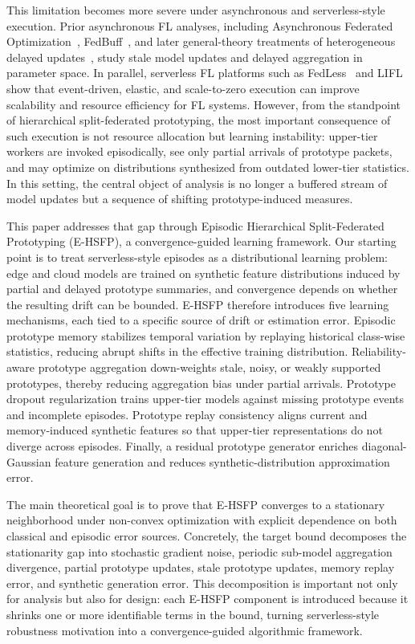 This limitation becomes more severe under asynchronous and serverless-style execution. Prior asynchronous FL analyses, including Asynchronous Federated Optimization~\cite{xie2019asynchronous}, FedBuff~\cite{nguyen2022federated}, and later general-theory treatments of heterogeneous delayed updates~\cite{fraboni2023general}, study stale model updates and delayed aggregation in parameter space. In parallel, serverless FL platforms such as FedLess~\cite{grafberger2021fedless} and LIFL~\cite{qi2024lifl} show that event-driven, elastic, and scale-to-zero execution can improve scalability and resource efficiency for FL systems. However, from the standpoint of hierarchical split-federated prototyping, the most important consequence of such execution is not resource allocation but learning instability: upper-tier workers are invoked episodically, see only partial arrivals of prototype packets, and may optimize on distributions synthesized from outdated lower-tier statistics. In this setting, the central object of analysis is no longer a buffered stream of model updates but a sequence of shifting prototype-induced measures. 

This paper addresses that gap through Episodic Hierarchical Split-Federated Prototyping (E-HSFP), a convergence-guided learning framework. Our starting point is to treat serverless-style episodes as a distributional learning problem: edge and cloud models are trained on synthetic feature distributions induced by partial and delayed prototype summaries, and convergence depends on whether the resulting drift can be bounded. E-HSFP therefore introduces five learning mechanisms, each tied to a specific source of drift or estimation error. Episodic prototype memory stabilizes temporal variation by replaying historical class-wise statistics, reducing abrupt shifts in the effective training distribution. Reliability-aware prototype aggregation down-weights stale, noisy, or weakly supported prototypes, thereby reducing aggregation bias under partial arrivals. Prototype dropout regularization trains upper-tier models against missing prototype events and incomplete episodes. Prototype replay consistency aligns current and memory-induced synthetic features so that upper-tier representations do not diverge across episodes. Finally, a residual prototype generator enriches diagonal-Gaussian feature generation and reduces synthetic-distribution approximation error.

The main theoretical goal is to prove that E-HSFP converges to a stationary neighborhood under non-convex optimization with explicit dependence on both classical and episodic error sources. Concretely, the target bound decomposes the stationarity gap into stochastic gradient noise, periodic sub-model aggregation divergence, partial prototype updates, stale prototype updates, memory replay error, and synthetic generation error. This decomposition is important not only for analysis but also for design: each E-HSFP component is introduced because it shrinks one or more identifiable terms in the bound, turning serverless-style robustness motivation into a convergence-guided algorithmic framework.

